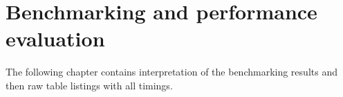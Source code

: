 \section{Benchmarking and performance evaluation}
\label{sec:final-bioseqdb-benchmarking}

The following chapter contains interpretation of the benchmarking results and then raw table listings with all timings.





